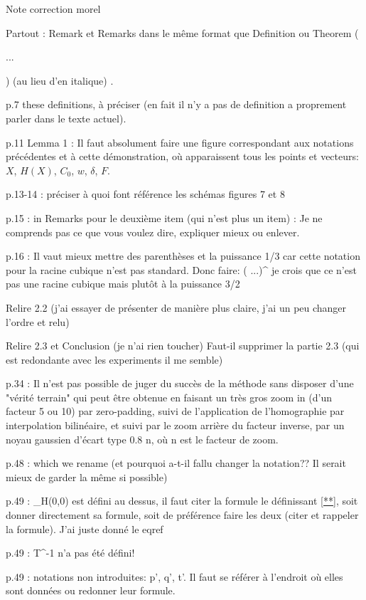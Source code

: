 Note correction morel

Partout : Remark et Remarks dans le même format que Definition ou Theorem (\begin{remark}...\end{remark}) (au lieu d’en italique) .

p.7 these definitions, à préciser (en fait il n’y a pas de definition a proprement parler dans le texte actuel).

p.11 Lemma 1 :  Il faut absolument faire une figure correspondant aux notations précédentes et à cette démonstration, où apparaissent tous  les points et vecteurs: $X$, $H(X)$, $C_0$, $w$, $\delta$, $F$.

p.13-14 : préciser à quoi font référence les schémas figures 7 et 8

p.15 : in Remarks pour le deuxième item (qui n’est plus un item) :  Je ne comprends pas ce que vous voulez dire, expliquer mieux ou enlever.

p.16  : Il vaut  mieux mettre des parenthèses et la puissance 1/3 car cette notation pour la racine cubique n'est pas standard. Donc faire: \left( ...\right)^
je crois que ce n’est pas une racine cubique mais plutôt à la puissance 3/2

Relire 2.2 (j’ai essayer de présenter de manière plus claire, j’ai un peu changer l’ordre et relu)

Relire 2.3 et Conclusion (je n’ai rien toucher) 
Faut-il supprimer la partie 2.3 (qui est redondante avec les experiments il me semble)

p.34 : Il n'est pas possible de juger du succès de la méthode sans disposer d'une "vérité terrain" qui peut être obtenue en faisant un très gros zoom in (d'un facteur 5 ou 10) par zero-padding, suivi de l'application de l'homographie par interpolation bilinéaire, et suivi par le zoom arrière du facteur inverse, par un noyau gaussien d'écart type 0.8 n, où n est  le facteur de zoom.

p.48 : which we rename
(et pourquoi a-t-il fallu changer la notation?? Il serait mieux de garder la même si possible)

p.49 : \Delta_H(0,0) est défini au dessus, il faut citer la formule le définissant \eqref{**}, soit donner directement sa formule, soit de préférence faire les deux (citer et rappeler la formule). 
J’ai juste donné le eqref

p.49 : T^{-1} n'a pas été défini!

p.49 : notations non introduites: p', q', t'. Il faut se référer à l'endroit où elles sont données ou redonner leur formule.

